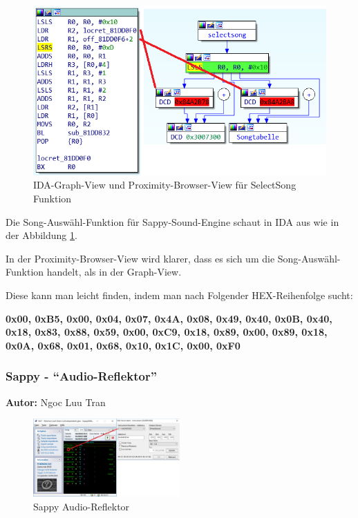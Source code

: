 \documentclass[11pt,a4paper]{scrartcl}
\newcommand{\AutorNgoc} {
    \vspace{-4mm}
    \large \textbf{Autor:} Ngoc Luu Tran \normalsize
    \vspace{2mm}
}
\begin{document}
\vspace{15pt}
\begin{figure}
	\vspace{-10pt}
	\centering
		\includegraphics[width=0.75\linewidth]{SelectSong}
	\vspace{-10pt}
	\caption{IDA-Graph-View und Proximity-Browser-View f\"ur SelectSong Funktion}
	\label{fig:SelectSong}
\end{figure}

Die Song-Ausw\"ahl-Funktion f\"ur Sappy-Sound-Engine schaut in IDA aus wie in der Abbildung \ref{fig:SelectSong}. 

In der Proximity-Browser-View wird klarer, dass es sich um die Song-Ausw\"ahl-Funktion handelt, als in der Graph-View.

Diese kann man leicht finden, indem man nach Folgender HEX-Reihenfolge sucht:

\textbf{0x00, 0xB5, 0x00, 0x04, 0x07, 0x4A, 0x08, 0x49,
0x40, 0x0B, 0x40, 0x18, 0x83, 0x88, 0x59, 0x00,
0xC9, 0x18, 0x89, 0x00, 0x89, 0x18, 0x0A, 0x68,
0x01, 0x68, 0x10, 0x1C, 0x00, 0xF0}

\newpage

\subsubsection{Sappy - \enquote{Audio-Reflektor}}
\AutorNgoc

\begin{figure}[h]
    \centering
    \includegraphics[width=0.5\textwidth]{Sappy}
    \caption{Sappy Audio-Reflektor}
    \label{fig:Sappy}
\end{figure}
\end{document}
